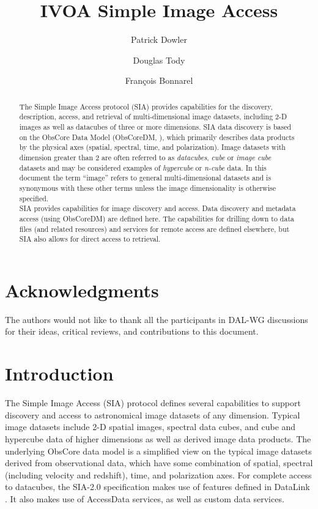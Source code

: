 \documentclass[11pt,a4paper]{ivoa}
\title{IVOA Simple Image Access}
\author{Patrick Dowler}
\author{Douglas Tody}
\author{Fran\c cois Bonnarel}
\begin{document}
\begin{abstract}
The Simple Image Access protocol (SIA) provides capabilities for the discovery, description, access, and retrieval of multi-dimensional image datasets, including 2-D images as well as datacubes of three or more dimensions.  SIA data discovery is based on the ObsCore Data Model (ObsCoreDM, \cite{std:OBSCORE}), which primarily describes data products by the physical axes (spatial, spectral, time, and polarization). Image datasets with dimension greater than 2 are often referred to as \textit{datacubes}, \textit{cube} or \textit{image cube} datasets and may be considered examples of \textit{hypercube} or \textit{n-cube} data.  In this document the term “image” refers to general multi-dimensional datasets and is synonymous with these other terms unless the image dimensionality is otherwise specified. \\
SIA provides capabilities for image discovery and access. Data discovery and  metadata access (using ObsCoreDM) are defined here. The capabilities for drilling down  to data files (and related resources) and services for remote access are defined elsewhere, but SIA also allows for direct access to retrieval. 
\end{abstract}
\section*{Acknowledgments}
The authors would not like to thank all the participants in DAL-WG discussions  for their ideas, critical reviews, and contributions to this document.

\section{Introduction}
The Simple Image Access (SIA) protocol defines several capabilities to support discovery and access to astronomical image datasets of any dimension.  Typical image datasets include 2-D spatial images, spectral data cubes, and cube and hypercube data of higher dimensions as well as derived image data products.  The underlying ObsCore data model is a simplified view on the typical image datasets derived from observational data, which have some combination of spatial, spectral (including velocity and redshift), time, and polarization axes.  
For complete access to datacubes, the SIA-2.0 specification  makes use of features defined in DataLink \citep{std:DataLink}. It also makes use of AccessData services, as well as custom data services.
\end{document}
